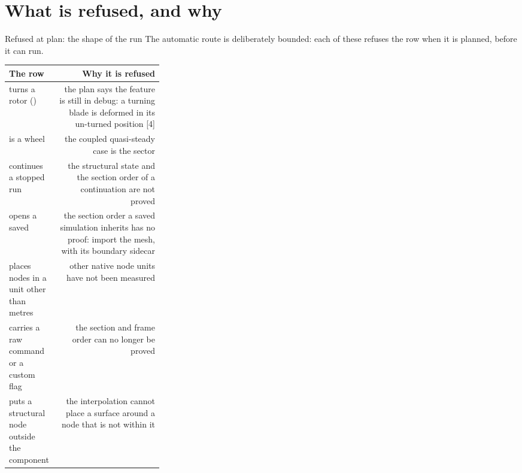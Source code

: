 %
%

\section{What is refused, and why}

\begin{frame}{Refused at plan: the shape of the run}
\small The automatic route is deliberately bounded: each of these refuses the
row when it is planned, before it can run.
\par\vspace{1.5mm}
{\ftstablesize\renewcommand{\arraystretch}{1.18}
\begin{tabularx}{\linewidth}{@{}P{0.30\linewidth}R@{}}
\toprule
\textbf{The row} & \textbf{Why it is refused} \\
\midrule
turns a rotor () & the plan says the feature is still in
  debug: a turning blade is deformed in its un-turned position [4] \\
is a  wheel & the coupled quasi-steady case is the sector \\
continues a stopped run & the structural state and the section order of a
  continuation are not proved \\
opens a saved  & the section order a saved simulation inherits has
  no proof: import the mesh, with its boundary sidecar \\
places nodes in a unit other than metres & other native node units have not
  been measured \\
carries a raw command or a custom flag & the section and frame order can no
  longer be proved \\
puts a structural node outside the component & the interpolation cannot
  place a surface around a node that is not within it \\
\bottomrule
\end{tabularx}}
\end{frame}

